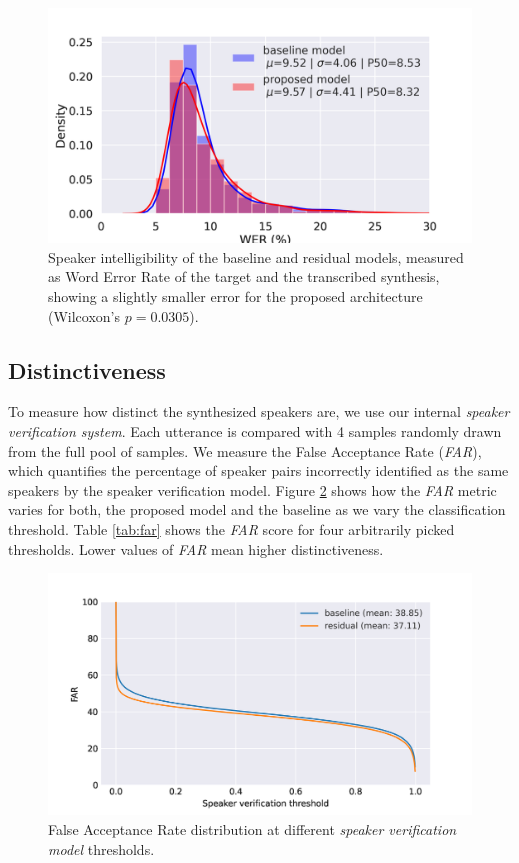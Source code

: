 \begin{figure}[h]
	\centering
	\includegraphics[width=0.95\linewidth]{tts/images/wer}
	\caption{Speaker intelligibility of the baseline and residual models, measured as Word Error Rate of the target and the transcribed synthesis, showing a slightly smaller error for the proposed architecture (Wilcoxon's $p=0.0305$).}
	\label{fig:wer}
\end{figure}


\subsection{Distinctiveness}
To measure how distinct the synthesized speakers are, we use our internal \textit{speaker verification system}.  Each utterance is compared with 4 samples randomly drawn from the full pool of samples. We measure the False Acceptance Rate (\textit{FAR}), which quantifies the percentage of speaker pairs incorrectly identified as the same speakers by the speaker verification model. Figure \ref{fig:far} shows how the \textit{FAR} metric varies for both, the proposed model and the baseline as we vary the classification threshold. Table \ref{tab:far} shows the \textit{FAR} score for four arbitrarily picked thresholds. Lower values of \textit{FAR} mean higher distinctiveness.

\begin{figure}[h]
	\centering
	\includegraphics[width=.95\linewidth]{tts/images/far}
	\caption{False Acceptance Rate distribution at different \textit{speaker verification model} thresholds.}
	\label{fig:far}
\end{figure}

